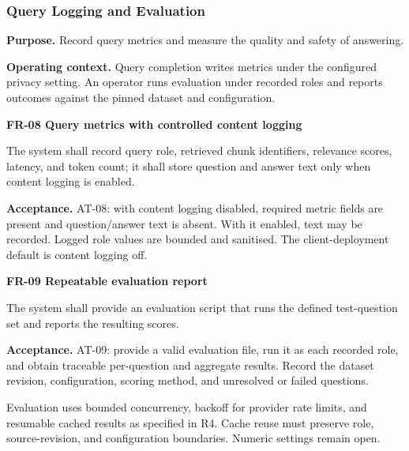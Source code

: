 \documentclass[11pt,letterpaper]{article}
\begin{document}
\subsubsection{Query Logging and Evaluation}

\textbf{Purpose.} Record query metrics and measure the quality and safety of answering.\par

\textbf{Operating context.} Query completion writes metrics under the configured privacy setting. An operator runs evaluation under recorded roles and reports outcomes against the pinned dataset and configuration.\par


\textbf{FR-08 Query metrics with controlled content logging}\par

The system shall record query role, retrieved chunk identifiers, relevance scores, latency, and token count; it shall store question and answer text only when content logging is enabled.\par

\textbf{Acceptance.} AT-08: with content logging disabled, required metric fields are present and question/answer text is absent. With it enabled, text may be recorded. Logged role values are bounded and sanitised. The client-deployment default is content logging off.\par


\textbf{FR-09 Repeatable evaluation report}\par

The system shall provide an evaluation script that runs the defined test-question set and reports the resulting scores.\par

\textbf{Acceptance.} AT-09: provide a valid evaluation file, run it as each recorded role, and obtain traceable per-question and aggregate results. Record the dataset revision, configuration, scoring method, and unresolved or failed questions.\par

Evaluation uses bounded concurrency, backoff for provider rate limits, and resumable cached results as specified in R4. Cache reuse must preserve role, source-revision, and configuration boundaries. Numeric settings remain open.\par
\end{document}
